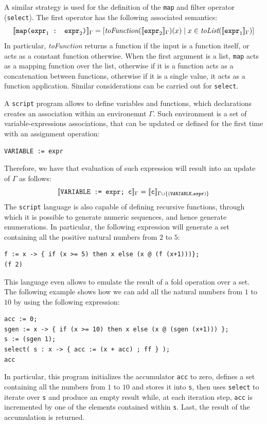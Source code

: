 A similar strategy is used for the definition of the \texttt{map} and filter operator (\texttt{select}). The first operator has the following associated semantics:
\[[\! [\texttt{map(expr}_1\texttt{ : expr}_2\texttt{)}]\!]_\Gamma=[\textit{toFunction}([\! [\texttt{expr}_2]\!]_\Gamma)(x)\mid x\in\textit{toList}([\! [\texttt{expr}_1]\!]_\Gamma)]\]
In particular, \textit{toFunction} returns a function if the input is a function itself, or acts as a constant function otherwise. When the first argument is a list, \texttt{map} acts as a mapping function over the list, otherwise if it is a function acts as a concatenation between functions, otherwise if it is a single value, it acts as a function application. Similar considerations can be carried out for \texttt{select}.

A \texttt{script} program allows to define variables and functions, which declarations creates an association within an environemnt  $\Gamma$. Such environment is a set of variable-expressions associations, that can be updated or defined for the first time with an assignment operation:
\begin{center}
	\texttt{VARIABLE := expr}
\end{center}
Therefore, we have that evaluation of such expression will result into an update of $\Gamma$ as follows:
\[[\! [\texttt{VARIABLE := expr; c}]\!]_\Gamma=[\! [\texttt{c}]\!]_{\Gamma\cup \{(\texttt{VARIABLE},\texttt{expr})\}}\]
The \texttt{script} language is also capable of defining recursive functions, through which it is possible to generate numeric sequences, and hence generate enumerations. In particular, the following expression will generate a set containing all the positive natural numbers from $2$ to $5$:
\begin{lstlisting}[language=Script]
f := x -> { if (x >= 5) then x else (x @ (f (x+1)))};
(f 2)
\end{lstlisting}
This language even allows to emulate the result of a fold operation over a set. The following example shows how we can add all the natural numbers from $1$ to $10$ by using the following expression:
\begin{lstlisting}[language=Script]
acc := 0;
sgen := x -> { if (x >= 10) then x else (x @ (sgen (x+1))) };
s := (sgen 1);
select( s : x -> { acc := (x + acc) ; ff } );
acc
\end{lstlisting}
In particular, this program initializes the accumulator \texttt{acc} to zero, defines a set containing all the numbers from $1$ to $10$ and stores it into \texttt{s}, then uses \texttt{select} to iterate over \texttt{s} and produce an empty result while, at each iteration step, \texttt{acc} is incremented by one of the elements contained within \texttt{s}. Last, the result of the accumulation is returned.

